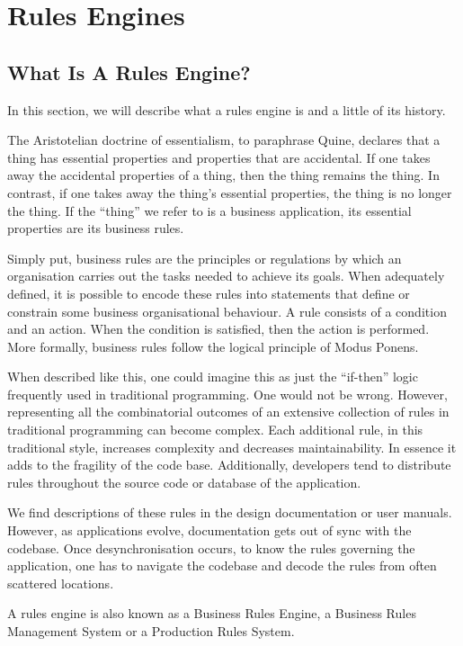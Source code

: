 \section{Rules Engines}

\subsection{What Is A Rules Engine?}

In this section, we will describe what a rules engine is and a little of its history.

The Aristotelian doctrine of essentialism, to paraphrase Quine\cite{quine1953three}, declares that a thing has essential properties and properties that are accidental.
If one takes away the accidental properties of a thing, then the thing remains the thing.
In contrast, if one takes away the thing's essential properties, the thing is no longer the thing.
If the ``thing'' we refer to is a business application, its essential properties are its business rules.

Simply put, business rules are the principles or regulations by which an organisation carries out the tasks needed to achieve its goals.
When adequately defined, it is possible to encode these rules into statements that define or constrain some business organisational behaviour.
A rule consists of a condition and an action.
When the condition is satisfied, then the action is performed.
More formally, business rules follow the logical principle of Modus Ponens.

When described like this, one could imagine this as just the ``if-then'' logic frequently used in traditional programming.
One would not be wrong. 
However, representing all the combinatorial outcomes of an extensive collection of rules in traditional programming can become complex.
Each additional rule, in this traditional style, increases complexity and decreases maintainability.
In essence it adds to the fragility of the code base.
Additionally, developers tend to distribute rules throughout the source code or database of the application.

We find descriptions of these rules in the design documentation or user manuals.
However, as applications evolve, documentation gets out of sync with the codebase.
Once desynchronisation occurs, to know the rules governing the application, one has to navigate the codebase and decode the rules from often scattered locations.

A rules engine is also known as a Business Rules Engine, a Business Rules Management System or a Production Rules System.

